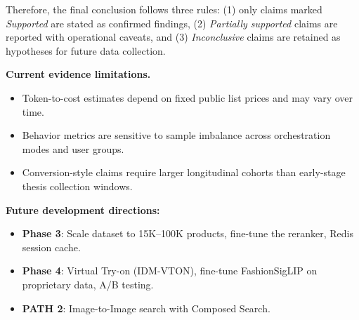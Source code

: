 \documentclass[12pt, twoside]{report}
\renewcommand{\bibname}{References}
\begin{document}
Therefore, the final conclusion follows three rules: (1) only claims marked \textit{Supported} are stated as confirmed findings, (2) \textit{Partially supported} claims are reported with operational caveats, and (3) \textit{Inconclusive} claims are retained as hypotheses for future data collection.

\textbf{Current evidence limitations.}
\begin{itemize}
    \item Token-to-cost estimates depend on fixed public list prices and may vary over time.
    \item Behavior metrics are sensitive to sample imbalance across orchestration modes and user groups.
    \item Conversion-style claims require larger longitudinal cohorts than early-stage thesis collection windows.
\end{itemize}

\textbf{Future development directions:}
\begin{itemize}
    \item \textbf{Phase 3}: Scale dataset to 15K--100K products, fine-tune the reranker, Redis session cache.
    \item \textbf{Phase 4}: Virtual Try-on (IDM-VTON), fine-tune FashionSigLIP on proprietary data, A/B testing.
    \item \textbf{PATH 2}: Image-to-Image search with Composed Search.
\end{itemize}

\renewcommand{\bibname}{References}
\end{document}
